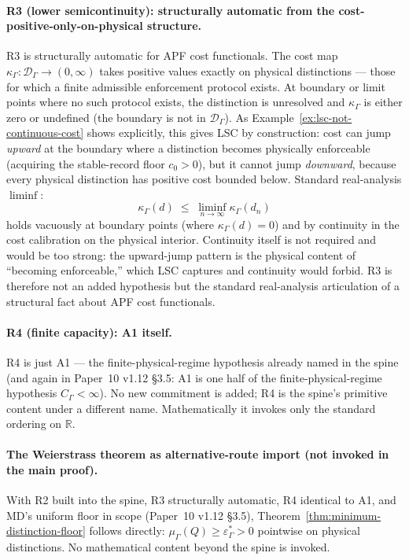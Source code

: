 \documentclass[11pt]{article}
\begin{document}
\paragraph{R3 (lower semicontinuity): structurally automatic from the cost-positive-only-on-physical structure.}
R3 is structurally automatic for APF cost functionals.  The cost map $\kappa_\Gamma : \mathcal D_\Gamma \to (0,\infty)$ takes positive values exactly on physical distinctions --- those for which a finite admissible enforcement protocol exists.  At boundary or limit points where no such protocol exists, the distinction is unresolved and $\kappa_\Gamma$ is either zero or undefined (the boundary is not in $\mathcal D_\Gamma$).  As Example~\ref{ex:lsc-not-continuous-cost} shows explicitly, this gives LSC by construction: cost can jump \emph{upward} at the boundary where a distinction becomes physically enforceable (acquiring the stable-record floor $c_0 > 0$), but it cannot jump \emph{downward}, because every physical distinction has positive cost bounded below.  Standard real-analysis $\liminf$:
\[
    \kappa_\Gamma(d) \;\le\; \liminf_{n\to\infty} \kappa_\Gamma(d_n)
\]
holds vacuously at boundary points (where $\kappa_\Gamma(d) = 0$) and by continuity in the cost calibration on the physical interior.  Continuity itself is not required and would be too strong: the upward-jump pattern is the physical content of ``becoming enforceable,'' which LSC captures and continuity would forbid.  R3 is therefore not an added hypothesis but the standard real-analysis articulation of a structural fact about APF cost functionals.

\paragraph{R4 (finite capacity): A1 itself.}
R4 is just A1 --- the finite-physical-regime hypothesis already named in the spine (and again in Paper~10 v1.12 \S3.5: A1 is one half of the finite-physical-regime hypothesis $C_\Gamma < \infty$).  No new commitment is added; R4 is the spine's primitive content under a different name.  Mathematically it invokes only the standard ordering on $\mathbb R$.

\paragraph{The Weierstrass theorem as alternative-route import (not invoked in the main proof).}
With R2 built into the spine, R3 structurally automatic, R4 identical to A1, and MD's uniform floor in scope (Paper~10 v1.12 \S3.5), Theorem~\ref{thm:minimum-distinction-floor} follows directly: $\mu_\Gamma(Q) \ge \varepsilon^*_\Gamma > 0$ pointwise on physical distinctions.  No mathematical content beyond the spine is invoked.
\end{document}
